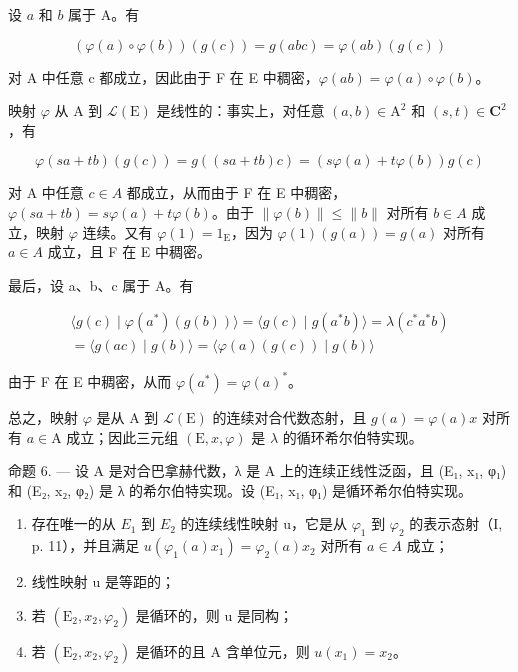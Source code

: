 设 \(a\) 和 \(b\) 属于 A。有

\[
(\varphi (a) \circ \varphi (b)) (g (c)) = g (a b c) = \varphi (a b) (g (c))
\]

对 A 中任意 c 都成立，因此由于 F 在 E 中稠密，\(\varphi(ab) = \varphi(a) \circ \varphi(b)\)。

映射 \(\varphi\) 从 A 到 \(\mathcal{L}(\mathrm{E})\) 是线性的：事实上，对任意 \((a,b)\in\mathrm{A}^{2}\) 和 \((s,t)\in\mathbf{C}^{2}\)，有

\[
\varphi (s a + t b) (g (c)) = g ((s a + t b) c) = (s \varphi (a) + t \varphi (b)) g (c)
\]

对 A 中任意 \(c \in A\) 都成立，从而由于 F 在 E 中稠密，\(\varphi(sa + tb) = s\varphi(a) + t\varphi(b)\)。由于 \(\|\varphi(b)\| \leqslant \|b\|\) 对所有 \(b \in A\) 成立，映射 \(\varphi\) 连续。又有 \(\varphi(1) = 1_{\mathrm{E}}\)，因为 \(\varphi(1)(g(a)) = g(a)\) 对所有 \(a \in A\) 成立，且 F 在 E 中稠密。

最后，设 a、b、c 属于 A。有

\[
\begin{array}{c} \langle g (c) \mid \varphi (a ^ {*}) (g (b)) \rangle = \langle g (c) \mid g (a ^ {*} b) \rangle = \lambda (c ^ {*} a ^ {*} b) \\ = \langle g (a c) \mid g (b) \rangle = \langle \varphi (a) (g (c)) \mid g (b) \rangle \end{array}
\]

由于 F 在 E 中稠密，从而 \(\varphi(a^{*})=\varphi(a)^{*}\)。

总之，映射 \(\varphi\) 是从 A 到 \(\mathcal{L}(\mathrm{E})\) 的连续对合代数态射，且 \(g(a) = \varphi(a)x\) 对所有 \(a \in \mathrm{A}\) 成立；因此三元组 \((\mathrm{E}, x, \varphi)\) 是 \(\lambda\) 的循环希尔伯特实现。

命题 6. --- 设 A 是对合巴拿赫代数，λ 是 A 上的连续正线性泛函，且 (E₁, x₁, φ₁) 和 (E₂, x₂, φ₂) 是 λ 的希尔伯特实现。设 (E₁, x₁, φ₁) 是循环希尔伯特实现。

\begin{enumerate}
\def\labelenumi{\alph{enumi})}
\item
  存在唯一的从 \(E_{1}\) 到 \(E_{2}\) 的连续线性映射 u，它是从 \(\varphi_{1}\) 到 \(\varphi_{2}\) 的表示态射（I, p. 11），并且满足 \(u(\varphi_{1}(a)x_{1}) = \varphi_{2}(a)x_{2}\) 对所有 \(a \in A\) 成立；
\item
  线性映射 u 是等距的；
\item
  若 \(\left(\mathrm{E}_{2},x_{2},\varphi_{2}\right)\) 是循环的，则 u 是同构；
\item
  若 \(\left(\mathrm{E}_2,x_2,\varphi_2\right)\) 是循环的且 A 含单位元，则 \(u(x_{1}) = x_{2}\)。
\end{enumerate}

